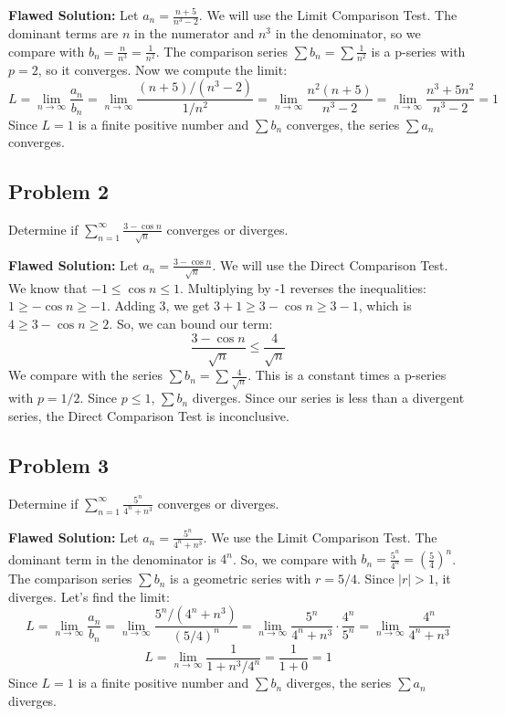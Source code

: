 \documentclass{article}
\begin{document}
\textbf{Flawed Solution:}
Let \(a_n = \frac{n+5}{n^3-2}\). We will use the Limit Comparison Test. The dominant terms are \(n\) in the numerator and \(n^3\) in the denominator, so we compare with \(b_n = \frac{n}{n^3} = \frac{1}{n^2}\).
The comparison series \(\sum b_n = \sum \frac{1}{n^2}\) is a p-series with \(p=2\), so it converges.
Now we compute the limit:
\[ L = \lim_{n \to \infty} \frac{a_n}{b_n} = \lim_{n \to \infty} \frac{(n+5)/(n^3-2)}{1/n^2} = \lim_{n \to \infty} \frac{n^2(n+5)}{n^3-2} = \lim_{n \to \infty} \frac{n^3+5n^2}{n^3-2} = 1 \]
Since \(L=1\) is a finite positive number and \(\sum b_n\) converges, the series \(\sum a_n\) converges.

\subsection{Problem 2}
Determine if \(\sum_{n=1}^{\infty} \frac{3-\cos n}{\sqrt{n}}\) converges or diverges.

\textbf{Flawed Solution:}
Let \(a_n = \frac{3-\cos n}{\sqrt{n}}\). We will use the Direct Comparison Test.
We know that \(-1 \leq \cos n \leq 1\). Multiplying by -1 reverses the inequalities: \(1 \geq -\cos n \geq -1\).
Adding 3, we get \(3+1 \geq 3-\cos n \geq 3-1\), which is \(4 \geq 3-\cos n \geq 2\).
So, we can bound our term:
\[ \frac{3-\cos n}{\sqrt{n}} \leq \frac{4}{\sqrt{n}} \]
We compare with the series \(\sum b_n = \sum \frac{4}{\sqrt{n}}\). This is a constant times a p-series with \(p=1/2\). Since \(p \leq 1\), \(\sum b_n\) diverges.
Since our series is less than a divergent series, the Direct Comparison Test is inconclusive.

\subsection{Problem 3}
Determine if \(\sum_{n=1}^{\infty} \frac{5^n}{4^n+n^3}\) converges or diverges.

\textbf{Flawed Solution:}
Let \(a_n = \frac{5^n}{4^n+n^3}\). We use the Limit Comparison Test.
The dominant term in the denominator is \(4^n\). So, we compare with \(b_n = \frac{5^n}{4^n} = \left(\frac{5}{4}\right)^n\).
The comparison series \(\sum b_n\) is a geometric series with \(r = 5/4\). Since \(|r|>1\), it diverges.
Let's find the limit:
\[ L = \lim_{n \to \infty} \frac{a_n}{b_n} = \lim_{n \to \infty} \frac{5^n/(4^n+n^3)}{(5/4)^n} = \lim_{n \to \infty} \frac{5^n}{4^n+n^3} \cdot \frac{4^n}{5^n} = \lim_{n \to \infty} \frac{4^n}{4^n+n^3} \]
\[ L = \lim_{n \to \infty} \frac{1}{1 + n^3/4^n} = \frac{1}{1+0} = 1 \]
Since \(L=1\) is a finite positive number and \(\sum b_n\) diverges, the series \(\sum a_n\) diverges.
\end{document}
